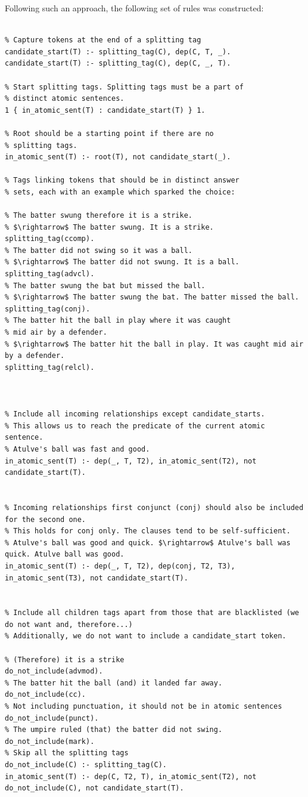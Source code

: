 Following such an approach, the following set of rules was constructed:
\begin{lstlisting}

% Capture tokens at the end of a splitting tag
candidate_start(T) :- splitting_tag(C), dep(C, T, _).
candidate_start(T) :- splitting_tag(C), dep(C, _, T).

% Start splitting tags. Splitting tags must be a part of 
% distinct atomic sentences.
1 { in_atomic_sent(T) : candidate_start(T) } 1.

% Root should be a starting point if there are no 
% splitting tags.
in_atomic_sent(T) :- root(T), not candidate_start(_).

% Tags linking tokens that should be in distinct answer 
% sets, each with an example which sparked the choice:

% The batter swung therefore it is a strike.
% $\rightarrow$ The batter swung. It is a strike.
splitting_tag(ccomp).
% The batter did not swing so it was a ball.  
% $\rightarrow$ The batter did not swung. It is a ball.
splitting_tag(advcl).
% The batter swung the bat but missed the ball.
% $\rightarrow$ The batter swung the bat. The batter missed the ball.
splitting_tag(conj).
% The batter hit the ball in play where it was caught 
% mid air by a defender.
% $\rightarrow$ The batter hit the ball in play. It was caught mid air by a defender.
splitting_tag(relcl).



% Include all incoming relationships except candidate_starts. 
% This allows us to reach the predicate of the current atomic sentence.
% Atulve's ball was fast and good.
in_atomic_sent(T) :- dep(_, T, T2), in_atomic_sent(T2), not candidate_start(T).


% Incoming relationships first conjunct (conj) should also be included for the second one.
% This holds for conj only. The clauses tend to be self-sufficient.
% Atulve's ball was good and quick. $\rightarrow$ Atulve's ball was quick. Atulve ball was good.
in_atomic_sent(T) :- dep(_, T, T2), dep(conj, T2, T3), in_atomic_sent(T3), not candidate_start(T).


% Include all children tags apart from those that are blacklisted (we do not want and, therefore...)
% Additionally, we do not want to include a candidate_start token. 

% (Therefore) it is a strike
do_not_include(advmod).
% The batter hit the ball (and) it landed far away.
do_not_include(cc).
% Not including punctuation, it should not be in atomic sentences 
do_not_include(punct).
% The umpire ruled (that) the batter did not swing.
do_not_include(mark).
% Skip all the splitting tags
do_not_include(C) :- splitting_tag(C).
in_atomic_sent(T) :- dep(C, T2, T), in_atomic_sent(T2), not do_not_include(C), not candidate_start(T).


\end{lstlisting}
